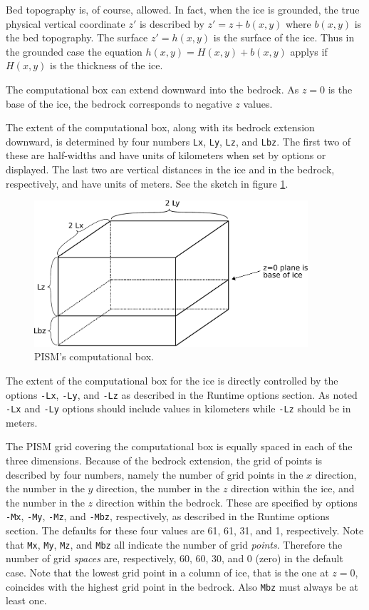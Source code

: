\documentclass[11pt,final]{amsart}
\renewcommand{\t}[1]{\texttt{#1}}
\begin{document}
Bed topography is, of course, allowed.  In fact, when the ice is grounded, the true physical vertical coordinate $z'$ is described by $z'=z+b(x,y)$ where $b(x,y)$ is the bed topography.  The surface $z'=h(x,y)$ is the surface of the ice.  Thus in the grounded case the equation $h(x,y)=H(x,y)+b(x,y)$ applys if $H(x,y)$ is the thickness of the ice.

The computational box can extend downward into the bedrock.  As $z=0$ is the base of the ice, the bedrock corresponds to negative $z$ values.

The extent of the computational box, along with its bedrock extension downward, is determined by four numbers \t{Lx}, \t{Ly}, \t{Lz}, and \t{Lbz}.  The first two of these are half-widths and have units of kilometers when set by options or displayed.  The last two are vertical distances in the ice and in the bedrock, respectively, and have units of meters.  See the sketch in figure \ref{fig:rectilinearbox}.

\begin{figure}[ht]
\includegraphics[width=4.0in,keepaspectratio=true]{figs/rectilinearbox}
\caption{PISM's computational box.}
\label{fig:rectilinearbox}
\end{figure}

The extent of the computational box for the ice is directly controlled by the options \t{-Lx}, \t{-Ly}, and \t{-Lz} as described in the Runtime options section.  As noted \t{-Lx} and \t{-Ly} options should include values in kilometers while \t{-Lz} should be in meters.

The PISM grid covering the computational box is equally spaced in each of the three dimensions.  Because of the bedrock extension, the grid of points is described by four numbers, namely the number of grid points in the $x$ direction, the number in the $y$ direction, the number in the $z$ direction within the ice, and the number in the $z$ direction within the bedrock.  These are specified by options \verb|-Mx|, \verb|-My|, \verb|-Mz|, and \verb|-Mbz|, respectively, as described in the Runtime options section.  The defaults for these four values are 61, 61, 31, and 1, respectively.  Note that \verb|Mx|, \verb|My|, \verb|Mz|, and \verb|Mbz| all indicate the number of grid \emph{points}.  Therefore the number of grid \emph{spaces} are, respectively, 60, 60, 30, and 0 (zero) in the default case.  Note that the lowest grid point in a column of ice, that is the one at $z=0$, coincides with the highest grid point in the bedrock.  Also \verb|Mbz| must always be at least one.
\end{document}
